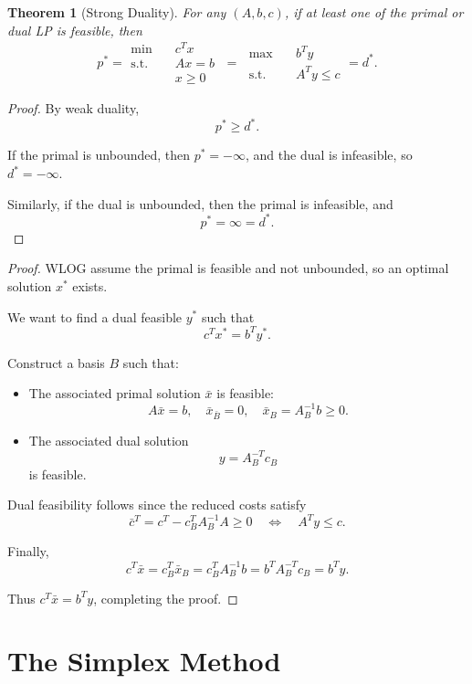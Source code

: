 \documentclass[12pt,oneside]{book}
\numberwithin{equation}{section}
\theoremstyle{definition}
\theoremstyle{plain}
\newtheorem{theorem}{Theorem}[section]
\theoremstyle{remark}
\begin{document}
\begin{theorem}[Strong Duality]
For any $(A,b,c)$, if at least one of the primal or dual LP is feasible, then
\[
p^* =
\begin{aligned}
\min \quad & c^T x \\
\text{s.t.} \quad & Ax = b \\
& x \ge 0
\end{aligned}
\;=\;
\begin{aligned}
\max \quad & b^T y \\
\text{s.t.} \quad & A^T y \le c
\end{aligned}
= d^*.
\]
\end{theorem}
    
\begin{proof}
By weak duality,
\[
p^* \ge d^*.
\]

If the primal is unbounded, then $p^* = -\infty$, and the dual is infeasible, so $d^* = -\infty$.

Similarly, if the dual is unbounded, then the primal is infeasible, and
\[
p^* = \infty = d^*.
\]
\end{proof}

\begin{proof}
WLOG assume the primal is feasible and not unbounded, so an optimal solution $x^*$ exists.

We want to find a dual feasible $y^*$ such that
\[
c^T x^* = b^T y^*.
\]

Construct a basis $B$ such that:
\begin{itemize}
\item The associated primal solution $\bar{x}$ is feasible:
\[
A\bar{x} = b, \quad \bar{x}_{\bar{B}} = 0, \quad \bar{x}_B = A_B^{-1} b \ge 0.
\]
\item The associated dual solution
\[
y = A_B^{-T} c_B
\]
is feasible.
\end{itemize}

Dual feasibility follows since the reduced costs satisfy
\[
\bar{c}^T = c^T - c_B^T A_B^{-1} A \ge 0
\quad \Longleftrightarrow \quad
A^T y \le c.
\]

Finally,
\[
c^T \bar{x}
= c_B^T \bar{x}_B
= c_B^T A_B^{-1} b
= b^T A_B^{-T} c_B
= b^T y.
\]

Thus $c^T \bar{x} = b^T y$, completing the proof.
\end{proof}

\section{The Simplex Method}
\end{document}
